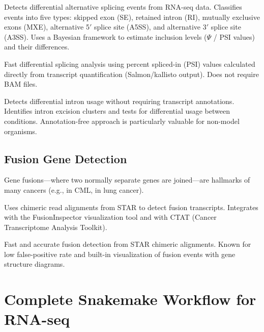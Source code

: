 \begin{description}[style=nextline]
  \item[\software{rMATS} (replicate Multivariate Analysis of Transcript Splicing)]
    Detects differential alternative splicing events from RNA-seq data.
    Classifies events into five types: skipped exon (SE), retained intron
    (RI), mutually exclusive exons (MXE), alternative 5$'$ splice site (A5SS),
    and alternative 3$'$ splice site (A3SS). Uses a Bayesian framework to
    estimate inclusion levels ($\Psi$ / PSI values) and their differences.
  \item[\software{SUPPA2}] Fast differential splicing analysis using percent
    spliced-in (PSI) values calculated directly from transcript quantification
    (Salmon/kallisto output). Does not require BAM files.
  \item[\software{Leafcutter}] Detects differential intron usage without
    requiring transcript annotations. Identifies intron excision clusters and
    tests for differential usage between conditions. Annotation-free approach
    is particularly valuable for non-model organisms.
\end{description}

\subsection{Fusion Gene Detection}

Gene fusions---where two normally separate genes are joined---are hallmarks of
many cancers (e.g.,  in CML,  in lung cancer).

\begin{description}[style=nextline]
  \item[\software{STAR-Fusion}] Uses chimeric read alignments from STAR to
    detect fusion transcripts. Integrates with the FusionInspector
    visualization tool and with CTAT (Cancer Transcriptome Analysis Toolkit).
  \item[\software{Arriba}] Fast and accurate fusion detection from STAR chimeric
    alignments. Known for low false-positive rate and built-in visualization
    of fusion events with gene structure diagrams.
\end{description}


\section{Complete Snakemake Workflow for RNA-seq}
\label{sec:rnaseq:snakemake}

